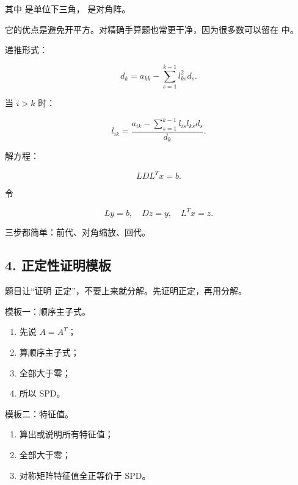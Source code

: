 \documentclass[11pt,a4paper]{ctexart}
\newcommand{\code}[1]{\begingroup\ttfamily\small #1\endgroup}
\begin{document}
其中 \code{} 是单位下三角，\code{} 是对角阵。

它的优点是避免开平方。对精确手算题也常更干净，因为很多数可以留在 \code{} 中。

递推形式：

\[
d_k=a_{kk}-\sum_{s=1}^{k-1}l_{ks}^2d_s.
\]

当 $i>k$ 时：

\[
l_{ik}=\frac{a_{ik}-\sum_{s=1}^{k-1}l_{is}l_{ks}d_s}{d_k}.
\]

解方程：

\[
LDL^Tx=b.
\]

令

\[
Ly=b,\quad Dz=y,\quad L^Tx=z.
\]

三步都简单：前代、对角缩放、回代。


\subsection*{4. 正定性证明模板}


题目让“证明 \code{} 正定”，不要上来就分解。先证明正定，再用分解。

模板一：顺序主子式。

\begin{enumerate}

\item 先说 $A=A^T$；

\item 算顺序主子式；

\item 全部大于零；

\item 所以 \code{} SPD。

\end{enumerate}

模板二：特征值。

\begin{enumerate}

\item 算出或说明所有特征值；

\item 全部大于零；

\item 对称矩阵特征值全正等价于 SPD。

\end{enumerate}
\end{document}
